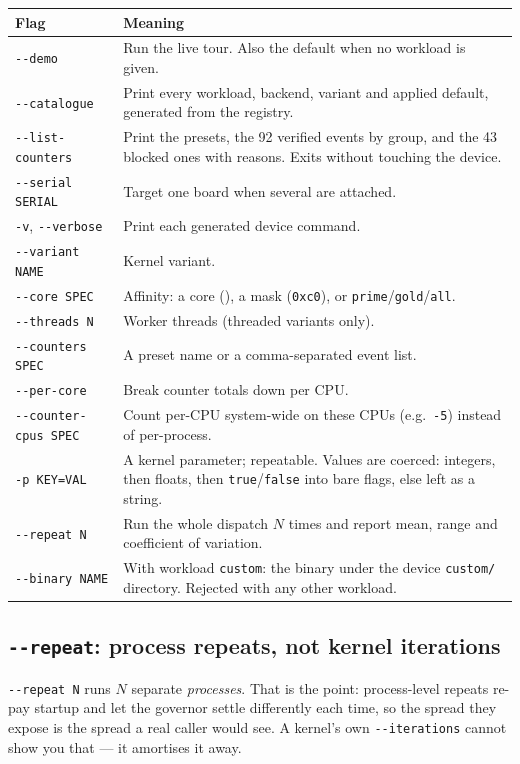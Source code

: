 \documentclass[11pt,a4paper]{article}
\newcommand{\code}[1]{\texttt{\let\_\breakableunderscore #1}}
\newcommand{\breakableunderscore}{\textunderscore\allowbreak}
\begin{document}
\begin{longtable}{@{}p{3.5cm}p{11.2cm}@{}}
\toprule
\textbf{Flag} & \textbf{Meaning} \\
\midrule
\endhead
\code{-{}-demo} & Run the live tour. Also the default when no workload is
  given. \\
\code{-{}-catalogue} & Print every workload, backend, variant and applied
  default, generated from the registry. \\
\code{-{}-list-counters} & Print the presets, the 92 verified events by group,
  and the 43 blocked ones with reasons. Exits without touching the device. \\
\code{-{}-serial SERIAL} & Target one board when several are attached. \\
\code{-v}, \code{-{}-verbose} & Print each generated device command. \\
\code{-{}-variant NAME} & Kernel variant. \\
\code{-{}-core SPEC} & Affinity: a core (\code{7}), a mask (\code{0xc0}), or
  \code{prime}/\code{gold}/\code{all}. \\
\code{-{}-threads N} & Worker threads (threaded variants only). \\
\code{-{}-counters SPEC} & A preset name or a comma-separated event list. \\
\code{-{}-per-core} & Break counter totals down per CPU. \\
\code{-{}-counter-cpus SPEC} & Count per-CPU system-wide on these CPUs
  (e.g.\ \code{0-5}) instead of per-process. \\
\code{-p KEY=VAL} & A kernel parameter; repeatable. Values are coerced:
  integers, then floats, then \code{true}/\code{false} into bare flags, else
  left as a string. \\
\code{-{}-repeat N} & Run the whole dispatch $N$ times and report mean, range
  and coefficient of variation. \\
\code{-{}-binary NAME} & With workload \code{custom}: the binary under the
  device \code{custom/} directory. Rejected with any other workload. \\
\bottomrule
\end{longtable}

\subsection{\texttt{-{}-repeat}: process repeats, not kernel iterations}

\code{-{}-repeat N} runs $N$ separate \emph{processes}. That is the point:
process-level repeats re-pay startup and let the governor settle differently
each time, so the spread they expose is the spread a real caller would see. A
kernel's own \code{-{}-iterations} cannot show you that --- it amortises it
away.
\end{document}
